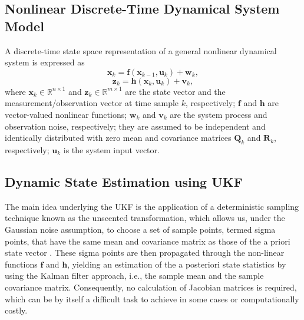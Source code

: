\documentclass[10pt]{IEEEtran}
\begin{document}
\subsection{Nonlinear Discrete-Time Dynamical System Model}
A discrete-time state space representation of a general nonlinear dynamical system is expressed as
\begin{equation}
{\bm{x}_k} = \bm{f}\left( {{\bm{x}_{k - 1}},{{\bm{u}}_{k}}} \right) + {{\bm{w}}_{k}},
\label{Eq:discrete_state_model}
\end{equation}
\vspace{-0.3cm}
\begin{equation}
\bm{z}_k = {\bm{h}}\left( {{\bm{x}_k},{{\bm{u}}_k}} \right) + {{\bm{v}}_k},
\label{Eq:discrete_observation_model}
\end{equation}
where $\bm{x}_k\in \mathbb{R}^{n\times 1}$ and $\bm{z}_k\in \mathbb{R}^{m\times 1}$ are the state vector and the measurement/observation vector at time sample $k$, respectively; $\bm{f}$ and $\bm{h}$ are vector-valued nonlinear functions; $\bm{w}_k$ and $\bm{v}_{k}$ are the system process and observation noise, respectively; they are assumed to be independent and identically distributed with zero mean and covariance matrices $\bm{Q}_k$ and $\bm{R}_k$, respectively; $\bm{u}_k$ is the system input vector.
\vspace{-0.3cm}
\subsection{Dynamic State Estimation using UKF}
The main idea underlying the UKF is the application of a deterministic sampling technique known as the unscented transformation, which allows us, under the Gaussian noise assumption, to choose a set of sample points, termed sigma points, that have the same mean and covariance matrix as those of the a priori state vector \cite{Julier2000}. These sigma points are then propagated through the non-linear functions $\bm{f}$ and $\bm{h}$, yielding an estimation of the a posteriori state statistics by using the Kalman filter approach, i.e., the sample mean and the sample covariance matrix. Consequently, no calculation of Jacobian matrices is required, which can be by itself a difficult task to achieve in some cases or computationally costly.
\end{document}
